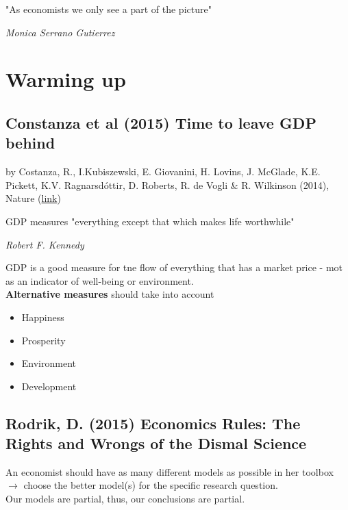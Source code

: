 \epigraph{"As economists we only see a part of the picture"}
{\textit{Monica Serrano Gutierrez}}

\section{Warming up}
\noindent
\begin{multicols}{2}
\subsection{Constanza et al (2015) Time to leave GDP behind}
by Costanza, R., I.Kubiszewski, E. Giovanini, H. Lovins, J. McGlade, K.E. Pickett, K.V. Ragnarsdóttir, D. Roberts, R. de Vogli \& R. Wilkinson (2014), Nature (\href{http://www.nature.com/news/development-time-to-leave-gdp-behind-1.14499}{link})
\epigraph{GDP measures "everything except that which makes life worthwhile"}
{\textit{Robert F. Kennedy}}
\noindent
GDP is a good measure for tne flow of everything that has a market price - mot as an indicator of well-being or environment.
\\
\textbf{Alternative measures} should take into account
\begin{itemize}
  \item Happiness
  \item Prosperity
  \item Environment
  \item Development
\end{itemize}
\subsection{Rodrik, D. (2015) Economics Rules: The Rights and Wrongs of the Dismal Science }
\noindent
An economist should have as many different models as possible in her toolbox\\
$\rightarrow$ choose the better model(s) for the specific research question.
\\
Our models are partial, thus, our conclusions are partial.


\end{multicols}
